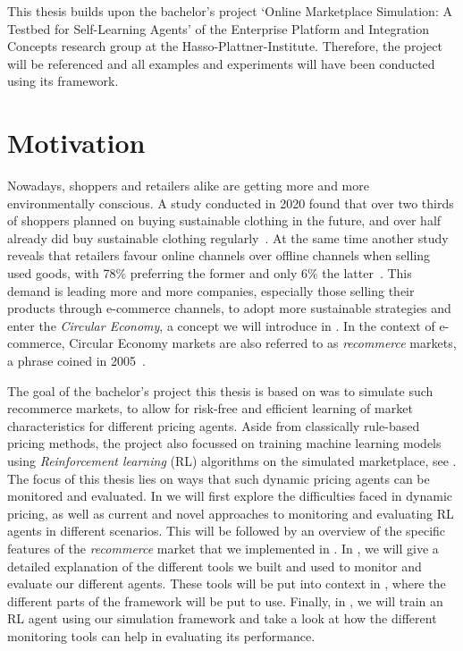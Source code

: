 \begin{jointwork}
	This thesis builds upon the bachelor's project `Online Marketplace Simulation: A Testbed for Self-Learning Agents' of the Enterprise Platform and Integration Concepts research group at the Hasso-Plattner-Institute. Therefore, the project will be referenced and all examples and experiments will have been conducted using its framework.
\end{jointwork}

\section{Motivation}

Nowadays, shoppers and retailers alike are getting more and more environmentally conscious. A study conducted in 2020 found that over two thirds of shoppers planned on buying sustainable clothing in the future, and over half already did buy sustainable clothing regularly~\cite{StatistaSustainableClothing}. At the same time another study reveals that retailers favour online channels over offline channels when selling used goods, with 78\% preferring the former and only 6\% the latter~\cite{StatistaUsedRetailers}. This demand is leading more and more companies, especially those selling their products through e-commerce channels, to adopt more sustainable strategies and enter the \emph{Circular Economy}, a concept we will introduce in . In the context of e-commerce, Circular Economy markets are also referred to as \emph{recommerce} markets, a phrase coined in 2005~\cite{RecommerceDefinition}.

The goal of the bachelor's project this thesis is based on was to simulate such recommerce markets, to allow for risk-free and efficient learning of market characteristics for different pricing agents. Aside from classically rule-based pricing methods, the project also focussed on training machine learning models using \emph{Reinforcement learning} (RL) algorithms on the simulated marketplace, see . The focus of this thesis lies on ways that such dynamic pricing agents can be monitored and evaluated. In  we will first explore the difficulties faced in dynamic pricing, as well as current and novel approaches to monitoring and evaluating RL agents in different scenarios. This will be followed by an overview of the specific features of the \emph{recommerce} market that we implemented in . In , we will give a detailed explanation of the different tools we built and used to monitor and evaluate our different agents. These tools will be put into context in , where the different parts of the framework will be put to use. Finally, in , we will train an RL agent using our simulation framework and take a look at how the different monitoring tools can help in evaluating its performance.

